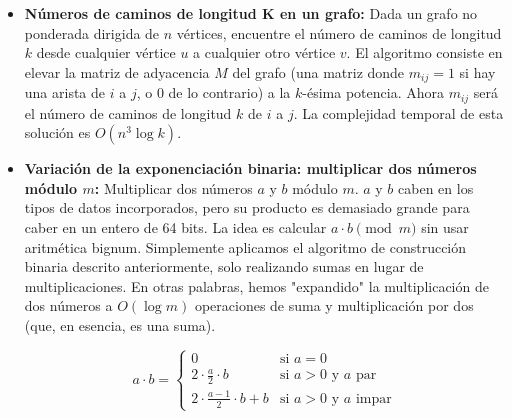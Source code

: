 \begin{itemize}
	\item \textbf{Números de caminos de longitud K en un grafo:} Dada un grafo no ponderada dirigida de 
	$n$ vértices, encuentre el número de caminos de longitud $k$ desde cualquier vértice $u$ a 
	cualquier otro vértice $v$.  El algoritmo consiste en elevar la matriz de adyacencia $M$ del grafo 
	(una matriz donde $m_{ij} = 1$ si hay una arista de $i$ a $j$, o $0$ de lo contrario) a la 
	$k$-ésima potencia. Ahora $m_{ij}$ será el número de caminos de longitud $k$ de $i$ a $j$. La 
	complejidad temporal de esta solución es $O(n^3 \log k)$.
	
	\item  \textbf{Variación de la exponenciación binaria: multiplicar dos números módulo $m$:} 
	Multiplicar dos números $a$ y $b$ módulo $m$. $a$ y $b$ caben en los tipos de datos incorporados, 
	pero su producto es demasiado grande para caber en un entero de 64 bits. La idea es calcular $a 
	\cdot b \pmod m$ sin usar aritmética bignum. Simplemente aplicamos el algoritmo de construcción 
	binaria descrito anteriormente, solo realizando sumas en lugar de multiplicaciones. En otras 
	palabras, hemos "expandido" la multiplicación de dos números a $O (\log m)$ operaciones de suma y 
	multiplicación por dos (que, en esencia, es una suma).
	
$$
a \cdot b = 
\begin{cases}
  0 &\text{si }a = 0 \\ 
  2 \cdot \frac{a}{2} \cdot b &\text{si }a > 0 \text{ y } a \text{ par} \\ 
  2 \cdot \frac{a-1}{2} \cdot b + b &\text{si }a > 0 \text{ y }a \text{ impar} 
\end{cases}
$$
\end{itemize}  